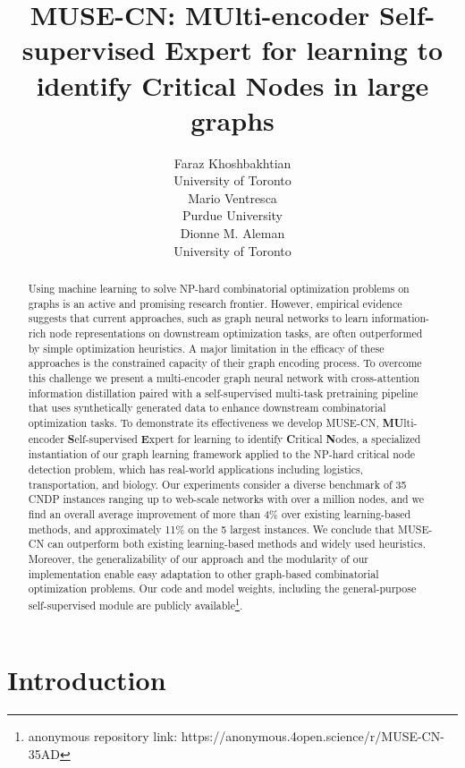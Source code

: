 \documentclass{article}
\title[MUSE-CN: Multi-encoder SSL Expert for Critical Node Detection]{MUSE-CN: MUlti-encoder Self-supervised Expert for learning to identify Critical Nodes in large graphs}
\author[F. Khoshbakhtian et al.]{%
Faraz Khoshbakhtian\\
University of Toronto\\
\email{faraz.khoshbakhtian@mail.utoronto.ca}\And
Mario Ventresca\\
Purdue University\\
\email{mventresca@purdue.edu}\And
Dionne M. Aleman\\
University of Toronto\\
\email{dionne.aleman@utoronto.ca}
}
\begin{document}
\maketitle

\begin{abstract}
Using machine learning to solve NP-hard combinatorial optimization problems on graphs is an active and promising research frontier. However, empirical evidence suggests that current approaches, such as graph neural networks to learn information-rich node representations on downstream optimization tasks, are often outperformed by simple optimization heuristics. A major limitation in the efficacy of these approaches is the constrained capacity of their graph encoding process. To overcome this challenge we present a multi-encoder graph neural network with cross-attention information distillation paired with a self-supervised multi-task pretraining pipeline that uses synthetically generated data to enhance downstream combinatorial optimization tasks. To demonstrate its effectiveness we develop MUSE-CN, \textbf{MU}lti-encoder \textbf{S}elf-supervised \textbf{E}xpert for learning to identify \textbf{C}ritical \textbf{N}odes, a specialized instantiation of our graph learning framework applied to the NP-hard critical node detection problem, which has real-world applications including logistics, transportation, and biology. Our experiments consider a diverse benchmark of 35 CNDP instances ranging up to web-scale networks with over a million nodes, and we find an overall average improvement of more than 4\% over existing learning-based methods, and approximately 11\% on the 5 largest instances. We conclude that MUSE-CN can outperform both existing learning-based methods and widely used heuristics. Moreover, the generalizability of our approach and the modularity of our implementation enable easy adaptation to other graph-based combinatorial optimization problems. Our code and model weights, including the general-purpose self-supervised module are publicly available\footnote{anonymous repository link: https://anonymous.4open.science/r/MUSE-CN-35AD}.
\end{abstract}

\section{Introduction}
\end{document}
